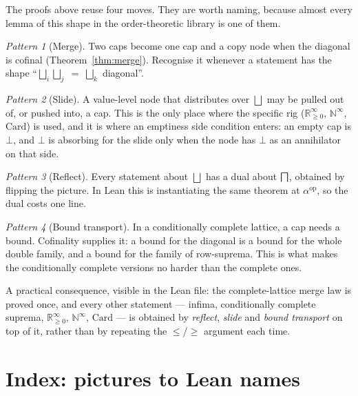 \documentclass[11pt,a4paper]{article}
\providecommand{\bigsqcap}{}
\renewcommand{\bigsqcap}{\mathop{\rotatebox[origin=c]{180}{$\bigsqcup$}}}
\newcommand{\Rzi}{\mathbb{R}_{\geq 0}^{\infty}}
\newcommand{\Ninf}{\mathbb{N}^{\infty}}
\newcommand{\Card}{\mathrm{Card}}
\theoremstyle{definition}
\theoremstyle{plain}
\theoremstyle{remark}
\newtheorem{pattern}{Pattern}
\begin{document}
The proofs above reuse four moves. They are worth naming, because almost every
lemma of this shape in the order-theoretic library is one of them.

\begin{pattern}[Merge]
Two caps become one cap and a copy node when the diagonal is cofinal
(Theorem~\ref{thm:merge}). Recognise it whenever a statement has the shape
``$\bigsqcup_i\bigsqcup_j\;=\;\bigsqcup_k$ diagonal''.
\end{pattern}

\begin{pattern}[Slide]
A value-level node that distributes over $\bigsqcup$ may be pulled out of, or
pushed into, a cap. This is the only place where the specific rig
($\Rzi$, $\Ninf$, $\Card$) is used, and it is where an emptiness side condition
enters: an empty cap is $\bot$, and $\bot$ is absorbing for the slide only when
the node has $\bot$ as an annihilator on that side.
\end{pattern}

\begin{pattern}[Reflect]
Every statement about $\bigsqcup$ has a dual about $\bigsqcap$, obtained by
flipping the picture. In Lean this is instantiating the same theorem at
$\alpha^{\mathrm{op}}$, so the dual costs one line.
\end{pattern}

\begin{pattern}[Bound transport]
In a conditionally complete lattice, a cap needs a bound. Cofinality supplies
it: a bound for the diagonal is a bound for the whole double family, and a
bound for the family of row-suprema. This is what makes the conditionally
complete versions no harder than the complete ones.
\end{pattern}

\medskip
\noindent
A practical consequence, visible in the Lean file: the complete-lattice merge
law is proved once, and every other statement --- infima, conditionally
complete suprema, $\Rzi$, $\Ninf$, $\Card$ --- is obtained by \emph{reflect},
\emph{slide} and \emph{bound transport} on top of it, rather than by repeating
the $\le$/$\ge$ argument each time.

\section{Index: pictures to Lean names}
\end{document}
